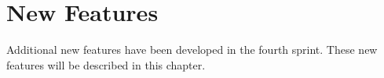 
\chapter{New Features}
\label{cha:new_features}
Additional new features have been developed in the fourth sprint. These new features will be described in this chapter.




